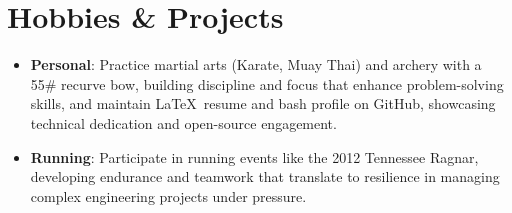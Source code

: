 \documentclass[letterpaper,12pt]{article} %
\newcommand{\resumeItem}[2]{\item\small{\textbf{#1}{: #2}}}
\newcommand{\resumeSubHeadingListStart}{\begin{itemize}[leftmargin=*,itemsep=6pt,topsep=6pt]} %
\newcommand{\resumeSubHeadingListEnd}{\end{itemize}}
\begin{document}
\section{Hobbies \& Projects}
\resumeSubHeadingListStart
  \resumeItem{Personal}{Practice martial arts (Karate, Muay Thai) and archery with a 55\# recurve bow, building discipline and focus that enhance problem-solving skills, and maintain \LaTeX\ resume and bash profile on GitHub, showcasing technical dedication and open-source engagement.}
  \resumeItem{Running}{Participate in running events like the 2012 Tennessee Ragnar, developing endurance and teamwork that translate to resilience in managing complex engineering projects under pressure.}
\resumeSubHeadingListEnd
\end{document}
